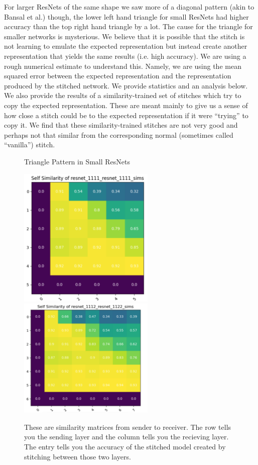 \documentclass{article} %
\begin{document}
For larger ResNets of the same shape we saw more of a diagonal pattern (akin to Bansal et al.) though, the lower left hand triangle for small
ResNets had higher
accuracy than the top right hand triangle by a lot. 
The cause for the triangle for smaller networks is mysterious. We believe that
it is possible that the stitch is not learning to emulate the expected representation but instead create another representation
that yields the same results (i.e. high accuracy). We are using a rough numerical estimate to understand this. Namely, we
are using the mean squared error between the expected representation and the representation produced by the stitched network.
We provide statistics and an analysis below. We also provide the results of a similarity-trained set of stitches which
try to copy the expected representation. These are meant mainly to give us a sense of how close a stitch could be to the
expected representation if it were ``trying'' to copy it. We find that these similarity-trained stitches are not very good
and perhaps not that similar from the corresponding normal (sometimes called ``vanilla'') stitch.

\label{Figure2}
\begin{center}
   \begin{figure}[h!]
      \centering
      \caption{Triangle Pattern in Small ResNets}
      \includegraphics[width=6.5cm]{resnet1111_1111.png}
      \includegraphics[width=6.5cm]{resnet1112_1122.png}
      \caption*{These are similarity matrices from sender to receiver. The row tells you the sending layer and the column tells you the recieving layer.
      The entry tells you the accuracy of the stitched model created by stitching between those two layers.}
   \end{figure}
\end{center}
\end{document}
